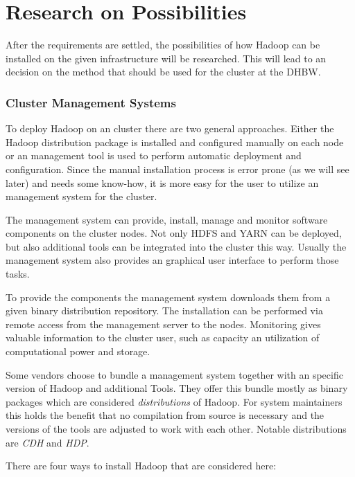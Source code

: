 \section{Research on Possibilities}

After the requirements are settled,
the possibilities of how Hadoop can be installed 
on the given infrastructure will be researched.
This will lead to an decision on the method that should be used for the cluster at the \ac{DHBW}.

\subsubsection{Cluster Management Systems}

To deploy Hadoop on an cluster there are two general approaches. Either the Hadoop distribution package is installed and configured manually on each node or an management tool is used to perform automatic deployment and configuration. 
Since the manual installation process is error prone (as we will see later) and needs some know-how,
it is  more easy for the user to utilize an management system for the cluster.

The management system can provide, install, manage and monitor software components on the cluster nodes.
Not only \ac{HDFS} and \ac{YARN} can be deployed,
but also additional tools can be integrated into the cluster this way.
Usually the management system also provides an graphical user interface to perform those tasks.

To provide the components the management system downloads them from a given binary distribution repository. The installation can be performed via remote access from the management server to the nodes. Monitoring gives valuable information to the cluster user, such as capacity an utilization of computational power and storage.

Some vendors choose to bundle a management system 
together with an specific version of Hadoop and additional Tools. They offer this bundle mostly as binary packages which are considered \emph{distributions} of Hadoop.
For system maintainers this holds the benefit that no compilation from source is necessary and the versions of the tools are adjusted to work with each other. 
Notable distributions are \emph{\acf{CDH}} and \emph{\acf{HDP}}. 

There are four ways to install Hadoop that are considered here:

